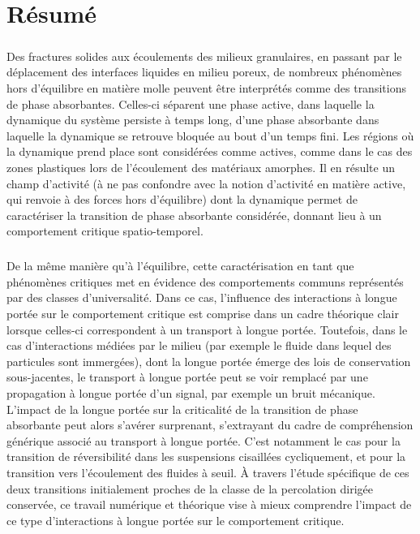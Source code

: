 \thispagestyle{empty}

\section*{Résumé}

\small

\subparagraph{}Des fractures solides aux écoulements des milieux granulaires, en passant par le déplacement des interfaces liquides en milieu poreux, de nombreux phénomènes hors d’équilibre en matière molle peuvent être interprétés comme des transitions de phase absorbantes. Celles-ci séparent une phase active, dans laquelle la dynamique du système persiste à temps long, d'une phase absorbante dans laquelle la dynamique se retrouve bloquée au bout d’un temps fini. Les régions où la dynamique prend place sont considérées comme actives, comme dans le cas des zones plastiques lors de l'écoulement des matériaux amorphes. Il en résulte un champ d’activité (à ne pas confondre avec la notion d’activité en matière active, qui renvoie à des forces hors d’équilibre) dont la dynamique permet de caractériser la transition de phase absorbante considérée, donnant lieu à un comportement critique spatio-temporel.

\subparagraph{}De la même manière qu'à l'équilibre, cette caractérisation en tant que phénomènes critiques met en évidence des comportements communs représentés par des classes d'universalité. Dans ce cas, l'influence des interactions à longue portée sur le comportement critique est comprise dans un cadre théorique clair lorsque celles-ci correspondent à un transport à longue portée. Toutefois, dans le cas d'interactions médiées par le milieu (par exemple le fluide dans lequel des particules sont immergées), dont la longue portée émerge des lois de conservation sous-jacentes, le transport à longue portée peut se voir remplacé par une propagation à longue portée d’un signal, par exemple un bruit mécanique. L'impact de la longue portée sur la criticalité de la transition de phase absorbante peut alors s'avérer surprenant, s'extrayant du cadre de compréhension générique associé au transport à longue portée. C'est notamment le cas pour la transition de réversibilité dans les suspensions cisaillées cycliquement, et pour la transition vers l'écoulement des fluides à seuil. \`A travers l'étude spécifique de ces deux transitions initialement proches de la classe de la percolation dirigée conservée, ce travail numérique et théorique vise à mieux comprendre l'impact de ce type d'interactions à longue portée sur le comportement critique.

